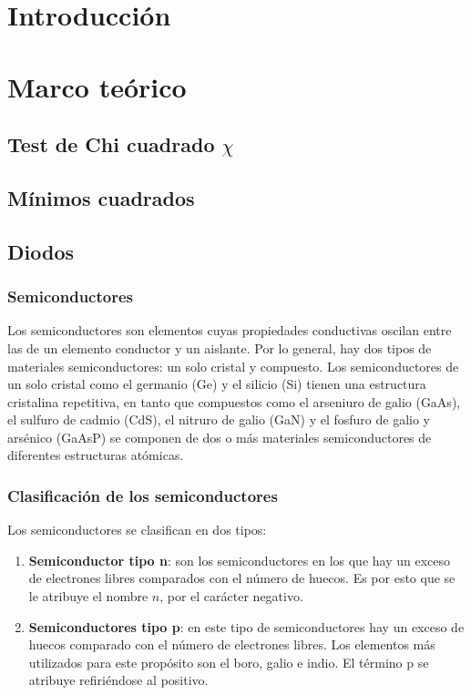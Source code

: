 \documentclass[twocolumn]{article} %
\title{}
\author{Jesús Armando Cañas \and Miguel Angel Perdomo}
\date{\today}
\begin{document}
\maketitle


\vspace{2cm} 

\section{Introducción}
\vspace{-0.3cm}

\section{Marco teórico}

\subsection{Test de Chi cuadrado $\chi$}

\subsection{Mínimos cuadrados}

\subsection{Diodos}

\subsubsection{Semiconductores}
Los semiconductores son elementos cuyas propiedades conductivas oscilan entre las de un elemento conductor y un aislante. Por lo general, hay dos tipos de materiales semiconductores: un solo cristal y compuesto. Los semiconductores de un solo cristal como el germanio (Ge) y el silicio (Si) tienen una estructura cristalina repetitiva, en tanto que compuestos como el arseniuro de galio (GaAs), el sulfuro de cadmio (CdS), el nitruro de galio (GaN) y el fosfuro de galio y arsénico (GaAsP) se componen de dos o más materiales semiconductores de diferentes estructuras atómicas.~\cite{rosadio}

\subsubsection{Clasificación de los semiconductores}
Los semiconductores se clasifican en dos tipos:
\begin{enumerate}
    \item \textbf{Semiconductor tipo n}: son los semiconductores en los que hay un exceso de electrones libres comparados con el número de huecos. Es por esto que se le atribuye el nombre $n$, por el carácter negativo.~\cite{rosadio}
    \item \textbf{Semiconductores tipo p}: en este tipo de semiconductores hay un exceso de huecos comparado con el número de electrones libres. Los elementos más utilizados para este propósito son el boro, galio e indio. El término p se atribuye refiriéndose al positivo.~\cite{rosadio}
\end{enumerate}
\end{document}

